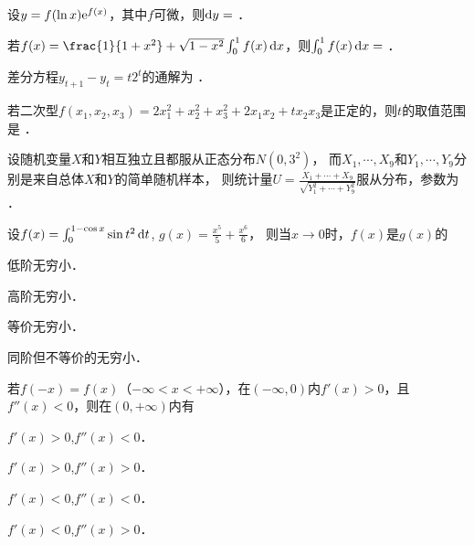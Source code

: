 \documentclass[plain,noanswer,medmath]{../../template/jnuexam}
\begin{document}






\begin{problem}
设$y = f(\ln x) \mathrm{e}^{f(x)}$，其中$f$可微，则$\mathop{}\!\mathrm{d} y =$ \fillin{}．
\end{problem}


\begin{problem}
若$f(x) = \frac{1}{1 + x^2} + \sqrt{1 - x^2} \int_0^1f(x)\dx$，则$\int_0^1f(x)\mathop{}\!\mathrm{d} x =$ \fillin{}．
\end{problem}


\begin{problem}
差分方程$y_{t + 1} - y_t = t2^t$的通解为 \fillin{}．
\end{problem}


\begin{problem}
若二次型$f(x_1,x_2,x_3) = 2x_1^2+ x_2^2+ x_3^2+ 2x_1x_2 + tx_2x_3$是正定的，则$t$的取值范围是 \fillin{}．
\end{problem}


\begin{problem}
设随机变量$X$和$Y$相互独立且都服从正态分布$N(0,3^2)$，
而$X_1, \cdots ,X_9$和$Y_1, \cdots ,Y_9$分别是来自总体$X$和$Y$的简单随机样本，
则统计量$U = \frac{X_1 + \cdots + X_9}{\sqrt{Y_1^2+ \cdots + Y_9^2}}$服从分布\fillin{}，参数为 \fillin{}．
\end{problem}




\begin{problem}
设$f(x) = \int_0^{1 - \cos x} \sin t^2 \mathop{}\!\mathrm{d} t$, $g(x) = \frac{x^5}{5} + \frac{x^6}{6}$，
则当$x \to 0$时，$f(x)$是$g(x)$的\pickout{}
\begin{abcd}
\item 低阶无穷小．                    
\item 高阶无穷小．
\item 等价无穷小．                    
\item 同阶但不等价的无穷小．
\end{abcd}
\end{problem}


\begin{problem}
若$f(- x) = f(x)$（$-\infty < x < +\infty$），在$(-\infty ,0)$内$f'(x) > 0$，且$f''(x) < 0$，则在$(0, +\infty)$内有\pickout{}
\begin{abcd}
\item $f'(x) > 0$,$f''(x) < 0$．
\item $f'(x) > 0$,$f''(x) > 0$．
\item $f'(x) < 0$,$f''(x) < 0$．
\item $f'(x) < 0$,$f''(x) > 0$．
\end{abcd}
\end{problem}
\end{document}

